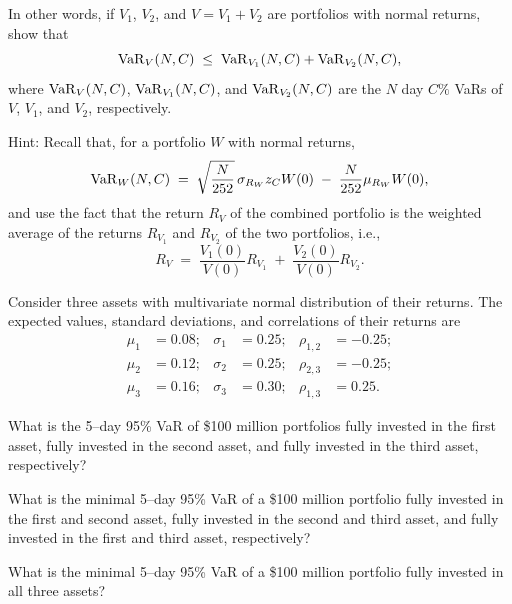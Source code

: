 \begin{exercises}
In other words, if $V_1$, $V_2$, and $V = V_1+V_2$ are portfolios with normal
returns, show that
\[
\operatorname{VaR}_V(N,C) \;\le\; \operatorname{VaR}_{V_1}(N,C) + \operatorname{VaR}_{V_2}(N,C),
\]
where $\operatorname{VaR}_V(N,C)$, $\operatorname{VaR}_{V_1}(N,C)$, and $\operatorname{VaR}_{V_2}(N,C)$ are the $N$ day
$C\%$ VaRs of $V$, $V_1$, and $V_2$, respectively.

Hint: Recall that, for a portfolio $W$ with normal returns,
\[
\operatorname{VaR}_W(N,C) \;=\; \sqrt{\frac{N}{252}}\,\sigma_{R_W} z_C W(0) \;-\; \frac{N}{252}\mu_{R_W}W(0),
\]
and use the fact that the return $R_V$ of the combined portfolio is the
weighted average of the returns $R_{V_1}$ and $R_{V_2}$ of the two
portfolios, i.e.,
\[
R_V \;=\; \frac{V_1(0)}{V(0)}R_{V_1} \;+\; \frac{V_2(0)}{V(0)}R_{V_2}.
\]

\item Consider three assets with multivariate normal distribution of their
returns. The expected values, standard deviations, and correlations of their
returns are
\[
\begin{aligned}
\mu_1 &= 0.08; & \sigma_1 &= 0.25; & \rho_{1,2} &= -0.25;\\
\mu_2 &= 0.12; & \sigma_2 &= 0.25; & \rho_{2,3} &= -0.25;\\
\mu_3 &= 0.16; & \sigma_3 &= 0.30; & \rho_{1,3} &= 0.25.
\end{aligned}
\]
\begin{subparts}
\item What is the 5--day 95\% VaR of \$100 million portfolios fully invested
in the first asset, fully invested in the second asset, and fully invested
in the third asset, respectively?
\item What is the minimal 5--day 95\% VaR of a \$100 million portfolio fully
invested in the first and second asset, fully invested in the second and
third asset, and fully invested in the first and third asset, respectively?
\item What is the minimal 5--day 95\% VaR of a \$100 million portfolio fully
invested in all three assets?
\end{subparts}

\end{exercises}
